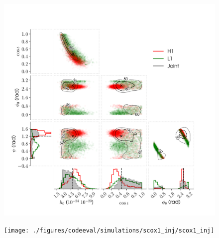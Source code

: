 \begin{figure}[!phtb]
\begin{center}
\includegraphics[width=1\columnwidth]{./figures/codeeval/simulations/S6_hwinj/hwinj05/hwinj05}
\caption{ \protect}
\end{center}
\end{figure}


\begin{figure}[phtb]
\begin{center}
\texttt{[image: ./figures/codeeval/simulations/scox1\_inj/scox1\_inj]}
\caption{ \protect}
\end{center}
\end{figure}



